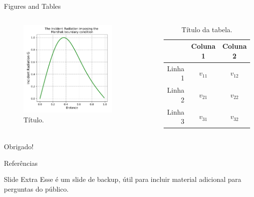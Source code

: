 \documentclass[aspectratio=169]{beamer}
\begin{document}
\begin{frame}{Figures and Tables}
	\begin{columns}
         \begin{figure}
         	\centering
            \includegraphics[width=0.8\textwidth]{./img/gw_d.pdf}
            \caption{Título.}
            \label{fig:focusl}
        \end{figure}    
        \begin{table}
       	\centering
        	\begin{tabular}{rcc}
            	& Coluna 1 & Coluna 2 \\\hline
                Linha 1 & \(v_{11}\) & \(v_{12}\) \\
                Linha 2 & \(v_{21}\) & \(v_{22}\) \\
               	Linha 3 & \(v_{31}\) & \(v_{32}\) \\
            \end{tabular}
        \caption{Título da tabela.}
        \label{tab:demo}
        \end{table}
    \end{columns}
\end{frame}
\begin{frame}[focus]
	Obrigado!
\end{frame}
\appendix
\begin{frame}{Referências}
    \nocite{*}
    
	
\end{frame}
\begin{frame}{Slide Extra}
	Esse é um slide de backup, útil para incluir material adicional para perguntas do público.
	\vfill
\end{frame}
\end{document}
